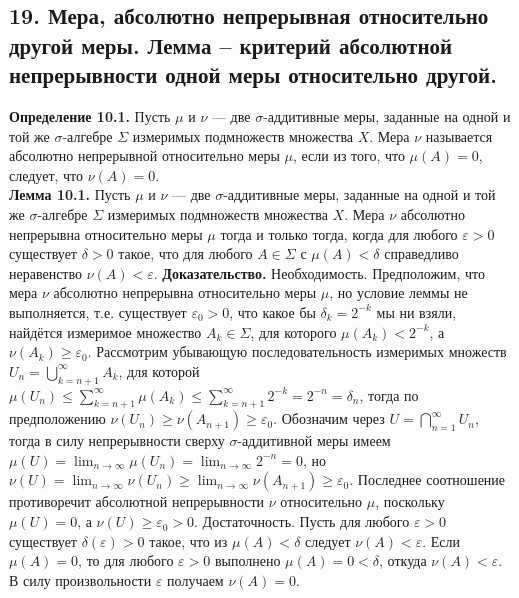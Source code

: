 \documentclass[12pt]{article}
\begin{document}
\subsection*{19. Мера, абсолютно непрерывная относительно другой меры. Лемма – критерий
абсолютной непрерывности одной меры относительно другой.}
\textbf{Определение 10.1.} Пусть $\mu$ и $\nu$ — две $\sigma$-аддитивные меры, заданные на одной и той же $\sigma$-алгебре $\Sigma$ измеримых подмножеств множества $X$. Мера $\nu$ называется абсолютно непрерывной относительно меры $\mu$, если из того, что $\mu(A)=0$, следует, что $\nu(A)=0$. \\\textbf{Лемма 10.1.} Пусть $\mu$ и $\nu$ — две $\sigma$-аддитивные меры, заданные на одной и той же $\sigma$-алгебре $\Sigma$ измеримых подмножеств множества $X$. Мера $\nu$ абсолютно непрерывна относительно меры $\mu$ тогда и только тогда, когда для любого $\varepsilon>0$ существует $\delta>0$ такое, что для любого $A\in\Sigma$ с $\mu(A)<\delta$ справедливо неравенство $\nu(A)<\varepsilon$. \textbf{Доказательство.} Необходимость. Предположим, что мера $\nu$ абсолютно непрерывна относительно меры $\mu$, но условие леммы не выполняется, т.е. существует $\varepsilon_0>0$, что какое бы $\delta_k=2^{-k}$ мы ни взяли, найдётся измеримое множество $A_k\in\Sigma$, для которого $\mu(A_k)<2^{-k}$, а $\nu(A_k)\geq\varepsilon_0$. Рассмотрим убывающую последовательность измеримых множеств $U_n=\bigcup_{k=n+1}^\infty A_k$, для которой $\mu(U_n)\leq\sum_{k=n+1}^\infty \mu(A_k)\leq\sum_{k=n+1}^\infty 2^{-k}=2^{-n}=\delta_n$, тогда по предположению $\nu(U_n)\geq\nu(A_{n+1})\geq\varepsilon_0$. Обозначим через $U=\bigcap_{n=1}^\infty U_n$, тогда в силу непрерывности сверху $\sigma$-аддитивной меры имеем $\mu(U)=\lim_{n\to\infty}\mu(U_n)=\lim_{n\to\infty}2^{-n}=0$, но $\nu(U)=\lim_{n\to\infty}\nu(U_n)\geq\lim_{n\to\infty}\nu(A_{n+1})\geq\varepsilon_0$. Последнее соотношение противоречит абсолютной непрерывности $\nu$ относительно $\mu$, поскольку $\mu(U)=0$, а $\nu(U)\geq\varepsilon_0>0$. Достаточность. Пусть для любого $\varepsilon>0$ существует $\delta(\varepsilon)>0$ такое, что из $\mu(A)<\delta$ следует $\nu(A)<\varepsilon$. Если $\mu(A)=0$, то для любого $\varepsilon>0$ выполнено $\mu(A)=0<\delta$, откуда $\nu(A)<\varepsilon$. В силу произвольности $\varepsilon$ получаем $\nu(A)=0$.

\end{document}
